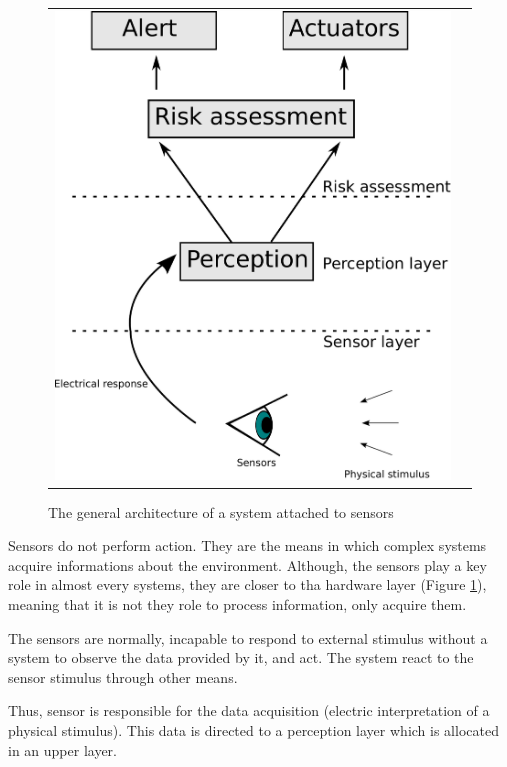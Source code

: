 \begin{figure}[h]
   \centering
     \begin{tabular}{lr}
       \includegraphics[scale=0.45]{img/fig:sensors:role}
     \end{tabular}
   \caption{The general architecture of a system attached to sensors}
   \label{fig:sensors:role}
 \end{figure}

Sensors do not perform action. They are the means in which complex systems acquire informations about the environment. Although, the sensors play a key role in almost every systems, they are closer to tha hardware layer (Figure \ref{fig:sensors:role}), meaning that it is not they role to process information, only acquire them. 

The sensors are normally, incapable to respond to external stimulus without a system to observe the data provided by it, and act. The system react to the sensor stimulus through other means.

Thus, sensor is responsible for the data acquisition (electric interpretation of a physical stimulus). This data is directed to a perception layer which is allocated in an upper layer.

